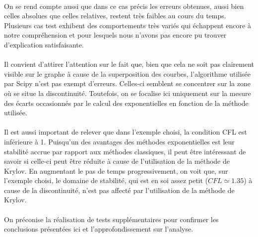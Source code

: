 \paragraph{}
On se rend compte aussi que dans ce cas précis les erreurs obtenues, aussi bien celles absolues que celles relatives, restent très faibles au cours du temps. Plusieurs cas test exhibent des comportements très variés qui échappent encore à notre compréhension et pour lesquels nous n'avons pas encore pu trouver d'explication satisfaisante.

\paragraph{}
Il convient d'attirer l'attention sur le fait que, bien que cela ne soit pas clairement visible sur le graphe à cause de la superposition des courbes, l'algorithme utilisée par Scipy n'est pas exempt d'erreurs. Celles-ci semblent se concentrer sur la zone où se situe la discontinuité. Toutefois, on se focalise ici uniquement sur la mesure des écarts occasionnés par le calcul des exponentielles en fonction de la méthode utilisée. 

\paragraph{}
Il est aussi important de relever que dans l'exemple choisi, la condition CFL est inférieure à 1. Puisqu'un des avantages des méthodes exponentielles est leur stabilité accrue par rapport aux méthodes classiques, il peut être intéressant de savoir si  celle-ci peut être réduite à cause de l'utilisation de la méthode de Krylov. En augmentant le pas de temps progressivement, on voit que, sur l'exemple choisi, le domaine de stabilité, qui est en soi assez petit ($CFL \simeq 1.35$) à cause de la discontinuité, n'est pas affecté par l'utilisation de la méthode de Krylov.

\paragraph{}
On préconise la réalisation de tests supplémentaires pour confirmer les conclusions présentées ici et l'approfondissement sur l'analyse.

